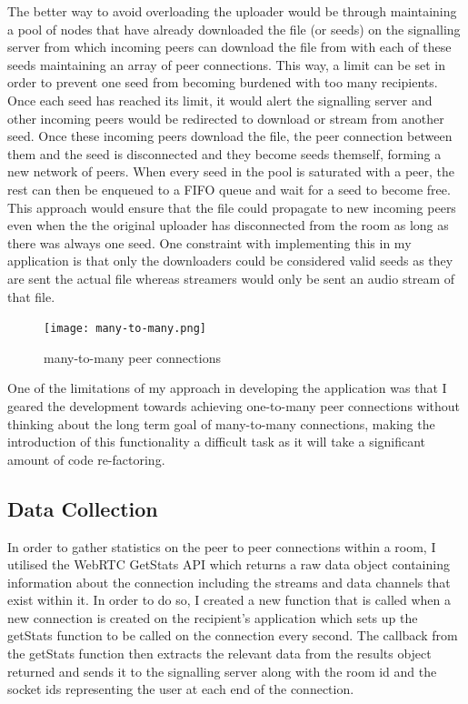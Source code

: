 \documentclass[]{report}
\begin{document}
			The better way to avoid overloading the uploader would be through maintaining a pool of nodes that have already downloaded the file (or seeds) on the signalling server from which incoming peers can download the file from with each of these seeds maintaining an array of peer connections. This way, a limit can be set in order to prevent one seed from becoming burdened with too many recipients. Once each seed has reached its limit, it would alert the signalling server and other incoming peers would be redirected to download or stream from another seed. Once these incoming peers download the file, the peer connection between them and the seed is disconnected and they become seeds themself, forming a new network of peers. When every seed in the pool is saturated with a peer, the rest can then be enqueued to a FIFO queue and wait for a seed to become free. This approach would ensure that the file could propagate to new incoming peers even when the the original uploader has disconnected from the room as long as there was always one seed. One constraint with implementing this in my application is that only the downloaders could be considered valid seeds as they are sent the actual file whereas streamers would only be sent an audio stream of that file.
			
			\begin{figure}[H]
				\caption{many-to-many peer connections}
				\centering
				\texttt{[image: many-to-many.png]}
			\end{figure}	
			
			One of the limitations of my approach in developing the application was that I geared the development towards achieving one-to-many peer connections without thinking about the long term goal of many-to-many connections, making the introduction of this functionality a difficult task as it will take a significant amount of code re-factoring.
			
			\subsection{Data Collection}
				In order to gather statistics on the peer to peer connections within a room, I utilised the WebRTC GetStats API which returns a raw data object containing information about the  connection including the streams and data channels that exist within it. In order to do so, I created a new function that is called when a new connection is created on the recipient's application which sets up the getStats function to be called on the connection every second. The callback from the getStats function then extracts the relevant data from the results object returned and sends it to the signalling server along with the room id and the socket ids representing the user at each end of the connection.
				
\end{document}
